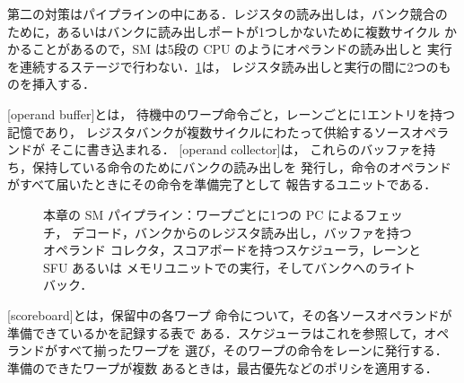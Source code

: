 \documentclass[../main.tex]{subfiles}
\begin{document}
第二の対策はパイプラインの中にある．レジスタの読み出しは，バンク競合の
ために，あるいはバンクに読み出しポートが1つしかないために複数サイクル
かかることがあるので，SM は5段の CPU のようにオペランドの読み出しと
実行を連続するステージで行わない．\cref{fig:l04-pipeline}は，
レジスタ読み出しと実行の間に2つのものを挿入する．

\begin{definition}[オペランドバッファとオペランドコレクタ]
  \label{def:l04-operand-collector}
  [operand buffer]とは，
  待機中のワープ命令ごと，レーンごとに1エントリを持つ記憶であり，
  レジスタバンクが複数サイクルにわたって供給するソースオペランドが
  そこに書き込まれる．
  [operand collector]は，
  これらのバッファを持ち，保持している命令のためにバンクの読み出しを
  発行し，命令のオペランドがすべて届いたときにその命令を準備完了として
  報告するユニットである．
\end{definition}

\begin{figure}[htbp]
  \centering
  
  \caption{本章の SM パイプライン：ワープごとに1つの PC によるフェッチ，
    デコード，バンクからのレジスタ読み出し，バッファを持つオペランド
    コレクタ，スコアボードを持つスケジューラ，レーンと SFU あるいは
    メモリユニットでの実行，そしてバンクへのライトバック．}
  \label{fig:l04-pipeline}
\end{figure}

\begin{definition}[スコアボード]
  \label{def:l04-scoreboard}
  [scoreboard]とは，保留中の各ワープ
  命令について，その各ソースオペランドが準備できているかを記録する表で
  ある．スケジューラはこれを参照して，オペランドがすべて揃ったワープを
  選び，そのワープの命令をレーンに発行する．準備のできたワープが複数
  あるときは，最古優先などのポリシを適用する．
\end{definition}
\end{document}
